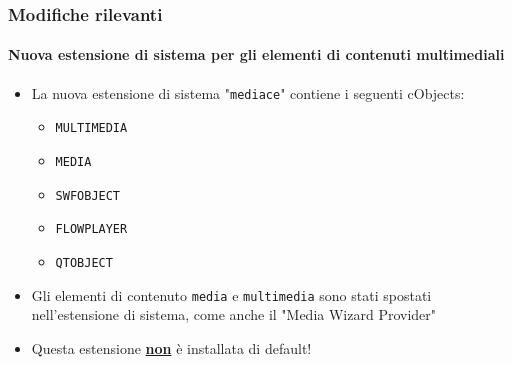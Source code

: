 \begin{frame}[fragile]
	\frametitle{Modifiche rilevanti}
	\framesubtitle{Nuova estensione di sistema per gli elementi di contenuti multimediali}

	\begin{itemize}

		\item La nuova estensione di sistema "\texttt{mediace}" contiene i seguenti cObjects:

			\begin{itemize}
				\item \texttt{MULTIMEDIA}
				\item \texttt{MEDIA}
				\item \texttt{SWFOBJECT}
				\item \texttt{FLOWPLAYER}
				\item \texttt{QTOBJECT}
			\end{itemize}

		\item Gli elementi di contenuto \texttt{media} e \texttt{multimedia} sono stati spostati 
			nell'estensione di sistema, come anche il "Media Wizard Provider"

		\item Questa estensione \underline{\textbf{non}} è installata di default!

	\end{itemize}

\end{frame}

